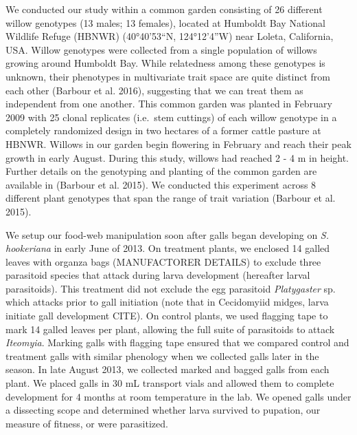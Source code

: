 \documentclass[]{elsarticle} %
\begin{document}
We conducted our study within a common garden consisting of 26 different
willow genotypes (13 males; 13 females), located at Humboldt Bay
National Wildlife Refuge (HBNWR) (40°40'53``N, 124°12'4''W) near Loleta,
California, USA. Willow genotypes were collected from a single
population of willows growing around Humboldt Bay. While relatedness
among these genotypes is unknown, their phenotypes in multivariate trait
space are quite distinct from each other (Barbour et al. 2016),
suggesting that we can treat them as independent from one another. This
common garden was planted in February 2009 with 25 clonal replicates
(i.e.~stem cuttings) of each willow genotype in a completely randomized
design in two hectares of a former cattle pasture at HBNWR. Willows in
our garden begin flowering in February and reach their peak growth in
early August. During this study, willows had reached 2 - 4 m in height.
Further details on the genotyping and planting of the common garden are
available in (Barbour et al. 2015). We conducted this experiment across
8 different plant genotypes that span the range of trait variation
(Barbour et al. 2015).

We setup our food-web manipulation soon after galls began developing on
\textit{S. hookeriana} in early June of 2013. On treatment plants, we
enclosed 14 galled leaves with organza bags (MANUFACTORER DETAILS) to
exclude three parasitoid species that attack during larva development
(hereafter larval parasitoids). This treatment did not exclude the egg
parasitoid \textit{Platygaster} sp. which attacks prior to gall
initiation (note that in Cecidomyiid midges, larva initiate gall
development CITE). On control plants, we used flagging tape to mark 14
galled leaves per plant, allowing the full suite of parasitoids to
attack \textit{Iteomyia}. Marking galls with flagging tape ensured that
we compared control and treatment galls with similar phenology when we
collected galls later in the season. In late August 2013, we collected
marked and bagged galls from each plant. We placed galls in 30 mL
transport vials and allowed them to complete development for 4 months at
room temperature in the lab. We opened galls under a dissecting scope
and determined whether larva survived to pupation, our measure of
fitness, or were parasitized.
\end{document}
